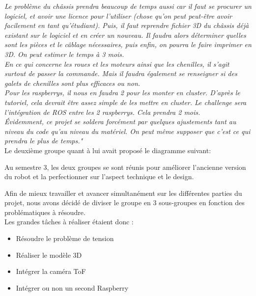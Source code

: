 \documentclass{PackagerQualityN}
\begin{document}
\textit{Le problème du châssis prendra beaucoup de temps aussi car il faut se procurer un logiciel, et avoir une licence pour l’utiliser (chose qu’on peut peut-être avoir facilement en tant qu’étudiant). Puis, il faut reprendre fichier 3D du châssis déjà existant sur le logiciel et en créer un nouveau. Il faudra alors déterminer quelles sont les pièces et le câblage nécessaires, puis enfin, on pourra le faire imprimer en 3D. On peut estimer le temps à 3 mois.}\\

\textit{En ce qui concerne les roues et les moteurs ainsi que les chenilles, il s’agit surtout de passer la commande. Mais il faudra également se renseigner si des galets de chenilles sont plus efficaces ou non.}\\
 

\textit{Pour les raspberrys, il nous en faudra 2 pour les monter en cluster. D’après le tutoriel, cela devrait être assez simple de les mettre en cluster. Le challenge sera l’intégration de ROS entre les 2 raspberrys. Cela prendra 2 mois.}\\

\textit{Évidemment, ce projet se soldera forcément par quelques ajustements tant au niveau du code qu’au niveau du matériel. On peut même supposer que c’est ce qui prendra le plus de temps."} \\

Le deuxième groupe quant à lui avait proposé le diagramme suivant:


Au semestre 3, les deux groupes se sont réunis pour améliorer l’ancienne version du robot et la perfectionner sur l’aspect technique et le design.

Afin de mieux travailler et avancer simultanément sur les différentes parties du projet, nous avons décidé de diviser le groupe en 3 sous-groupes en fonction des problématiques à résoudre.\\

Les grandes tâches à réaliser étaient donc :
\begin{itemize}
    \item Résoudre le problème de tension
    \item Réaliser le modèle 3D
    \item Intégrer la caméra ToF
    \item Intégrer ou non un second Raspberry\\
\end{itemize}
\end{document}
